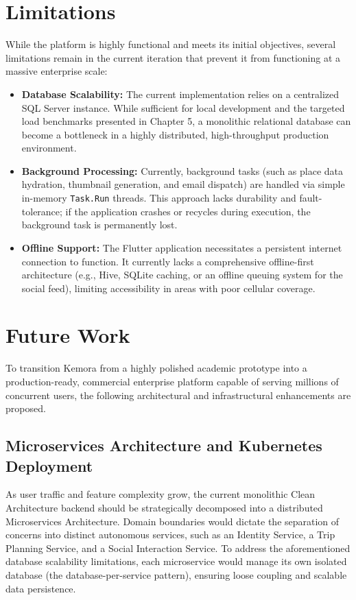\section{Limitations}
While the platform is highly functional and meets its initial objectives, several limitations remain in the current iteration that prevent it from functioning at a massive enterprise scale:
\begin{itemize}
    \item \textbf{Database Scalability:} The current implementation relies on a centralized SQL Server instance. While sufficient for local development and the targeted load benchmarks presented in Chapter 5, a monolithic relational database can become a bottleneck in a highly distributed, high-throughput production environment.
    \item \textbf{Background Processing:} Currently, background tasks (such as place data hydration, thumbnail generation, and email dispatch) are handled via simple in-memory \texttt{Task.Run} threads. This approach lacks durability and fault-tolerance; if the application crashes or recycles during execution, the background task is permanently lost.
    \item \textbf{Offline Support:} The Flutter application necessitates a persistent internet connection to function. It currently lacks a comprehensive offline-first architecture (e.g., Hive, SQLite caching, or an offline queuing system for the social feed), limiting accessibility in areas with poor cellular coverage.
\end{itemize}

\section{Future Work}
To transition Kemora from a highly polished academic prototype into a production-ready, commercial enterprise platform capable of serving millions of concurrent users, the following architectural and infrastructural enhancements are proposed.

\subsection{Microservices Architecture and Kubernetes Deployment}
As user traffic and feature complexity grow, the current monolithic Clean Architecture backend should be strategically decomposed into a distributed Microservices Architecture. Domain boundaries would dictate the separation of concerns into distinct autonomous services, such as an Identity Service, a Trip Planning Service, and a Social Interaction Service. To address the aforementioned database scalability limitations, each microservice would manage its own isolated database (the database-per-service pattern), ensuring loose coupling and scalable data persistence.

